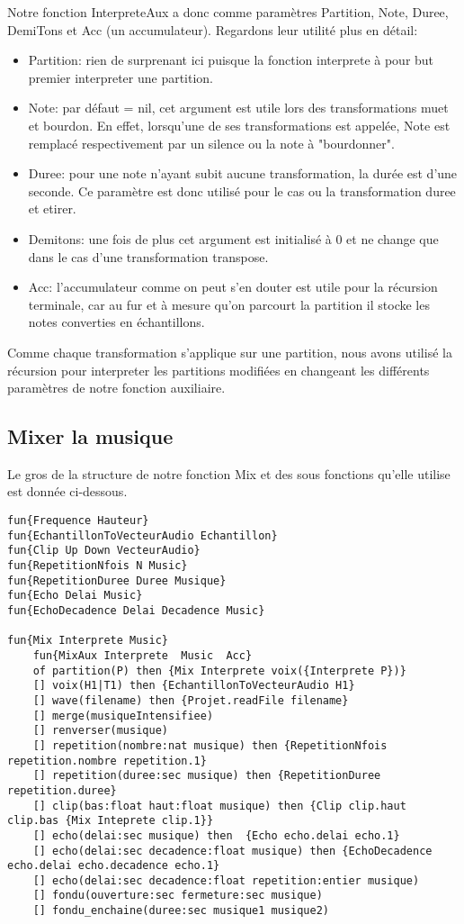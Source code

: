 \documentclass[a4paper,12pt]{report}
\begin{document}
Notre fonction InterpreteAux a donc comme paramètres Partition, Note, Duree, DemiTons et Acc (un accumulateur). Regardons leur utilité plus en détail:
\begin{itemize}
\item Partition: rien de surprenant ici puisque la fonction interprete à pour but premier interpreter une partition. 
\item Note: par défaut = nil, cet argument est utile lors des transformations muet et bourdon. En effet, lorsqu'une de ses transformations est appelée, Note est remplacé respectivement par un silence ou la note à "bourdonner".  
\item Duree: pour une note n'ayant subit aucune transformation, la durée est d'une seconde. Ce paramètre est donc utilisé pour le cas ou la transformation duree et etirer.
\item Demitons: une fois de plus cet argument est initialisé à 0 et ne change que dans le cas d'une transformation transpose.
\item Acc: l'accumulateur comme on peut s'en douter est utile pour la récursion terminale, car au fur et à mesure qu'on parcourt la partition il stocke les notes converties en échantillons. 
\end{itemize}


Comme chaque transformation s'applique sur une partition, nous avons utilisé la récursion pour interpreter les partitions modifiées en changeant les différents paramètres de notre fonction auxiliaire.


\subsection*{Mixer la musique}
Le gros de la structure de notre fonction Mix et des sous fonctions qu'elle utilise est donnée ci-dessous.

\begin{lstlisting}[frame=single] 
fun{Frequence Hauteur}
fun{EchantillonToVecteurAudio Echantillon}
fun{Clip Up Down VecteurAudio}
fun{RepetitionNfois N Music}
fun{RepetitionDuree Duree Musique}
fun{Echo Delai Music}
fun{EchoDecadence Delai Decadence Music}

fun{Mix Interprete Music}
	fun{MixAux Interprete  Music  Acc}
	of partition(P) then {Mix Interprete voix({Interprete P})}
	[] voix(H1|T1) then {EchantillonToVecteurAudio H1}
	[] wave(filename) then {Projet.readFile filename}
	[] merge(musiqueIntensifiee)
	[] renverser(musique) 
	[] repetition(nombre:nat musique) then {RepetitionNfois repetition.nombre repetition.1}
	[] repetition(duree:sec musique) then {RepetitionDuree repetition.duree}
	[] clip(bas:float haut:float musique) then {Clip clip.haut clip.bas {Mix Inteprete clip.1}}
	[] echo(delai:sec musique) then  {Echo echo.delai echo.1}
	[] echo(delai:sec decadence:float musique) then {EchoDecadence echo.delai echo.decadence echo.1}
	[] echo(delai:sec decadence:float repetition:entier musique)
	[] fondu(ouverture:sec fermeture:sec musique)
	[] fondu_enchaine(duree:sec musique1 musique2)

\end{lstlisting}
\end{document}

